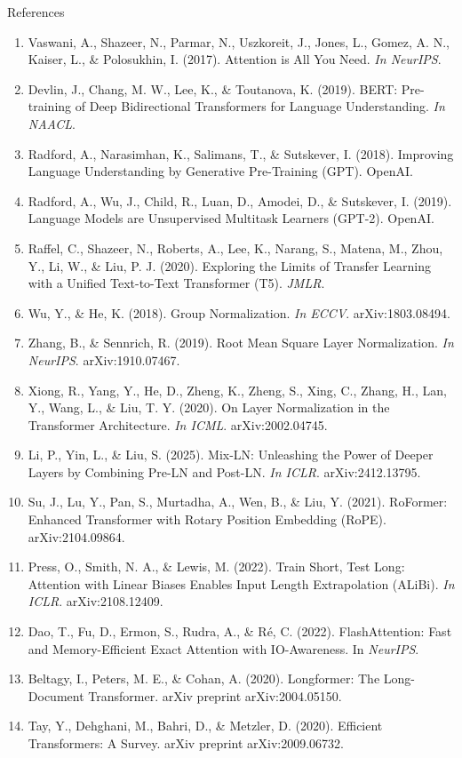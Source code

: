\begin{frame}[allowframebreaks]{References}
  \footnotesize
  \begin{enumerate}
    \item Vaswani, A., Shazeer, N., Parmar, N., Uszkoreit, J., Jones, L., Gomez, A. N., Kaiser, L., \& Polosukhin, I. (2017). Attention is All You Need. \textit{In NeurIPS}.
    \item Devlin, J., Chang, M. W., Lee, K., \& Toutanova, K. (2019). BERT: Pre-training of Deep Bidirectional Transformers for Language Understanding. \textit{In NAACL}.
    \item Radford, A., Narasimhan, K., Salimans, T., \& Sutskever, I. (2018). Improving Language Understanding by Generative Pre-Training (GPT). OpenAI.
    \item Radford, A., Wu, J., Child, R., Luan, D., Amodei, D., \& Sutskever, I. (2019). Language Models are Unsupervised Multitask Learners (GPT-2). OpenAI.
    \item Raffel, C., Shazeer, N., Roberts, A., Lee, K., Narang, S., Matena, M., Zhou, Y., Li, W., \& Liu, P. J. (2020). Exploring the Limits of Transfer Learning with a Unified Text-to-Text Transformer (T5). \textit{JMLR}.
    \item Wu, Y., \& He, K. (2018). Group Normalization. \textit{In ECCV}. arXiv:1803.08494.
    \item Zhang, B., \& Sennrich, R. (2019). Root Mean Square Layer Normalization. \textit{In NeurIPS}. arXiv:1910.07467.
    \item Xiong, R., Yang, Y., He, D., Zheng, K., Zheng, S., Xing, C., Zhang, H., Lan, Y., Wang, L., \& Liu, T. Y. (2020). On Layer Normalization in the Transformer Architecture. \textit{In ICML}. arXiv:2002.04745.
    \item Li, P., Yin, L., \& Liu, S. (2025). Mix-LN: Unleashing the Power of Deeper Layers by Combining Pre-LN and Post-LN. \textit{In ICLR}. arXiv:2412.13795.
    \item Su, J., Lu, Y., Pan, S., Murtadha, A., Wen, B., \& Liu, Y. (2021). RoFormer: Enhanced Transformer with Rotary Position Embedding (RoPE). arXiv:2104.09864.
    \item Press, O., Smith, N. A., \& Lewis, M. (2022). Train Short, Test Long: Attention with Linear Biases Enables Input Length Extrapolation (ALiBi). \textit{In ICLR}. arXiv:2108.12409.
    \item Dao, T., Fu, D., Ermon, S., Rudra, A., \& Ré, C. (2022). FlashAttention: Fast and Memory-Efficient Exact Attention with IO-Awareness. In \textit{NeurIPS}.
    \item Beltagy, I., Peters, M. E., \& Cohan, A. (2020). Longformer: The Long-Document Transformer. arXiv preprint arXiv:2004.05150.
    \item Tay, Y., Dehghani, M., Bahri, D., \& Metzler, D. (2020). Efficient Transformers: A Survey. arXiv preprint arXiv:2009.06732.
  \end{enumerate}
\end{frame}
